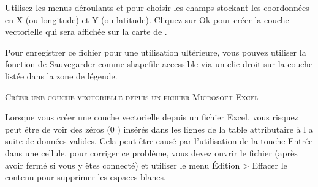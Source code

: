 
Utilisez les menus déroulants  et  pour choisir les champs stockant les coordonnées en X  (ou longitude) et Y  (ou latitude). Cliquez sur Ok pour créer la couche vectorielle qui sera affichée sur la carte de \qg.


Pour enregistrer ce fichier pour une utilisation ultérieure, vous pouvez utiliser la fonction de \qg Sauvegarder comme shapefile  accessible via un clic droit sur la couche listée dans la zone de légende.


\begin{Tip}\caption{\textsc{Créer une couche vectorielle depuis un fichier Microsoft Excel}}
Lorsque vous créer une couche vectorielle depuis un fichier Excel, vous risquez peut être de voir des zéros (0 ) insérés dans les lignes de la table attributaire à l a suite de données valides. Cela peut être causé par l'utilisation de la touche Entrée dans une cellule. pour corriger ce problème, vous devez ouvrir le fichier (après avoir fermé \qg si vous y êtes connecté) et utiliser le menu Édition > Effacer le contenu pour supprimer les espaces blancs.
\end{Tip}

